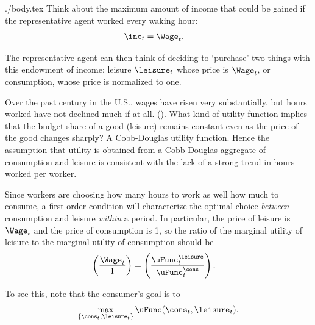 \documentclass{handout}
\begin{document}
\begin{verbatimwrite}{./body.tex}
Think about the maximum amount of income that could be gained if the representative agent
worked every waking hour:
\begin{equation}\begin{gathered}\begin{aligned}
        \inc_{t} & =  \Wage_{t}.
\end{aligned}\end{gathered}\end{equation}

The representative agent can then think of deciding to `purchase' two things with this 
endowment of income: leisure $\leisure_{t}$ whose price is $\Wage_{t}$, or 
consumption, whose price is normalized to one.

Over the past century in the U.S., wages have risen very substantially, but hours 
worked have not declined much if at all. (\cite{rameyFrancisLeisure}).  What kind of utility 
function implies that the budget share of a good 
(leisure) remains constant even as the price of the good changes 
sharply?  A Cobb-Douglas utility function.  Hence the assumption that 
utility is obtained from a Cobb-Douglas aggregate of consumption and 
leisure is consistent with the lack of a strong trend in hours worked per 
worker.

Since workers are choosing how many hours to work
as well how much to consume, a first order condition
will characterize the optimal choice {\it between} consumption
and leisure {\it within} a period.  In particular, the price of leisure
is $\Wage_{t}$ and the price of consumption is 1, so the ratio of the
marginal utility of leisure to the marginal utility of consumption
should be 
\begin{equation}\begin{gathered}\begin{aligned}
        \left(\frac{\Wage_{t}}{1}\right) & =  \left(\frac{\uFunc^{\leisure }_{t}}{\uFunc^{\cons}_{t}}\right). \label{eq:focwucul}
\end{aligned}\end{gathered}\end{equation}

To see this, note that the consumer's goal is to
\begin{equation}
\max_{\{\cons_{t},\leisure_{t}\}} \uFunc(\cons_{t},\leisure_{t})     .
        \label{eq:intramax}
\end{equation}


\end{verbatimwrite}
\end{document}
